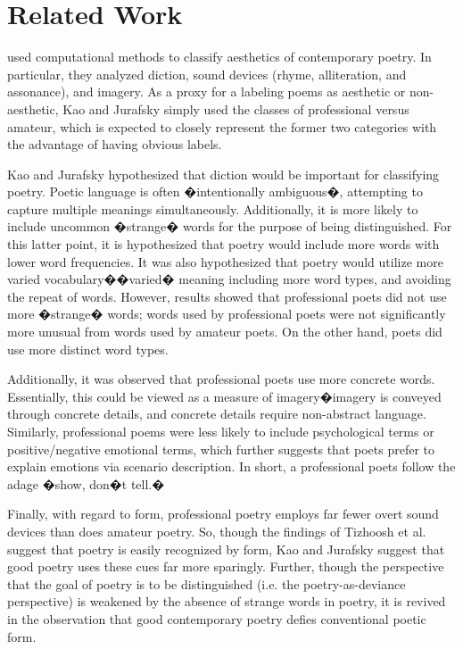 \documentclass[11pt]{article}
\begin{document}
\section{Related Work}

 used computational methods to classify aesthetics of contemporary poetry. In particular, they analyzed diction, sound devices (rhyme, alliteration, and assonance), and imagery. As a proxy for a labeling poems as aesthetic or non-aesthetic, Kao and Jurafsky simply used the classes of professional versus amateur, which is expected to closely represent the former two categories with the advantage of having obvious labels.

Kao and Jurafsky hypothesized that diction would be important for classifying poetry. Poetic language is often �intentionally ambiguous�, attempting to capture multiple meanings simultaneously. Additionally, it is more likely to include uncommon �strange� words for the purpose of being distinguished. For this latter point, it is hypothesized that poetry would include more words with lower word frequencies. It was also hypothesized that poetry would utilize more varied vocabulary��varied� meaning including more word types, and avoiding the repeat of words. However, results showed that professional poets did not use more �strange� words; words used by professional poets were not significantly more unusual from words used by amateur poets. On the other hand, poets did use more distinct word types.

Additionally, it was observed that professional poets use more concrete words. Essentially, this could be viewed as a measure of imagery�imagery is conveyed through concrete details, and concrete details require non-abstract language. Similarly, professional poems were less likely to include psychological terms or positive/negative emotional terms, which further suggests that poets prefer to explain emotions via scenario description. In short, a professional poets follow the adage �show, don�t tell.�

Finally, with regard to form, professional poetry employs far fewer overt sound devices than does amateur poetry. So, though the findings of Tizhoosh et al. suggest that poetry is easily recognized by form, Kao and Jurafsky suggest that good poetry uses these cues far more sparingly. Further, though the perspective that the goal of poetry is to be distinguished (i.e. the poetry-as-deviance perspective) is weakened by the absence of strange words in poetry, it is revived in the observation that good contemporary poetry defies conventional poetic form.
\end{document}
